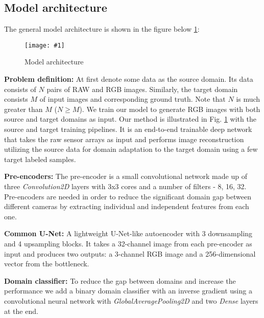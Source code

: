 \documentclass{article}
\newcommand{\addimghere}[4]{ %
    \begin{figure}[H]
        \centering
        \texttt{[image: \#1]}
        \caption{#3} \label{#4}
    \end{figure}
}
\begin{document}
\subsection{Model architecture}

The general model architecture is shown in the figure below \ref{main-arch}:

\addimghere{main-arch}{0.9}{Model architecture}{main-arch}

\textbf{Problem definition:} At first denote some data as the source domain. Its data consists of $N$ pairs of RAW and RGB images. Similarly, the target domain consists $M$ of input images and corresponding ground truth. Note that $N$ is much greater than $M$ ($N \geqslant M$). We train our model to generate RGB images with both source and target domains as input. Our method is illustrated in Fig. \ref{main-arch} with the source and target training pipelines. It is an end-to-end trainable deep network that takes the raw sensor arrays as input and performs image reconstruction utilizing the source data for domain adaptation to the target domain using a few target labeled samples. 

\textbf{Pre-encoders:} The pre-encoder is a small convolutional network made up of three \textit{Convolution2D} layers with 3x3 cores and a number of filters - 8, 16, 32. Pre-encoders are needed in order to reduce the significant domain gap between different cameras by extracting individual and independent features from each one. 

\textbf{Common U-Net:} A lightweight U-Net-like \cite{ronneberger2015u} autoencoder with 3 downsampling and 4 upsampling blocks. It takes a 32-channel image from each pre-encoder as input and produces two outputs: a 3-channel RGB image and a 256-dimensional vector from the bottleneck.

\textbf{Domain classifier:} To reduce the gap between domains and increase the performance we add a binary domain classifier \cite{ganin2016domain} with an inverse gradient \cite{ganin2015unsupervised} using a convolutional neural network with \textit{GlobalAveragePooling2D} and two \textit{Dense} layers at the end.
\end{document}
